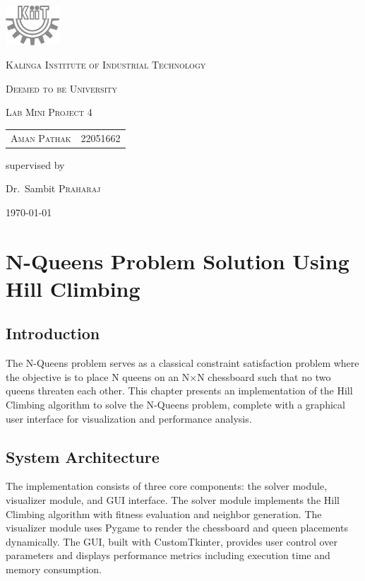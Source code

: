 \documentclass{report}
\begin{document}
	
	\begin{titlepage}
		\centering
		\includegraphics[width=0.15\textwidth]{./assets/bw_kiit.png}\par\vspace{1cm}
		{\LARGE \textsc{Kalinga Institute of Industrial Technology}\par}
		{\textsc{Deemed to be University}\par}
		\vspace{1cm}
		{\Large \textsc{Lab Mini Project 4}\par}
		\vspace{1.5cm}
		{\huge{}\par}
		\vspace{1cm}
		\begin{tabular}{ll}
			\textsc{Aman Pathak}       & 22051662 \\
		\end{tabular}
		\vspace{0.5cm}					
		\vfill
		supervised by\par
		Dr.~Sambit \textsc{Praharaj}
		
		\vfill
		
		{\large \today\par}
	\end{titlepage}
	
	
	
	\chapter{N-Queens Problem Solution Using Hill Climbing}
	
	\section{Introduction}
	The N-Queens problem serves as a classical constraint satisfaction problem where the objective is to place N queens on an N×N chessboard such that no two queens threaten each other. This chapter presents an implementation of the Hill Climbing algorithm to solve the N-Queens problem, complete with a graphical user interface for visualization and performance analysis.
	
	\section{System Architecture}
	The implementation consists of three core components: the solver module, visualizer module, and GUI interface. The solver module implements the Hill Climbing algorithm with fitness evaluation and neighbor generation. The visualizer module uses Pygame to render the chessboard and queen placements dynamically. The GUI, built with CustomTkinter, provides user control over parameters and displays performance metrics including execution time and memory consumption.
	
\end{document}
